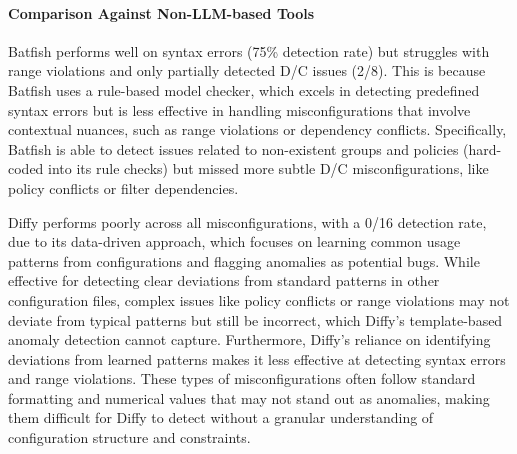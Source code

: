 


\paragraph{Comparison Against Non-LLM-based Tools}
Batfish performs well on syntax errors (75\% detection rate) but struggles
with range violations and only partially detected D/C issues (2/8).
This is because Batfish uses a rule-based model checker, which excels in detecting predefined
syntax errors but is less effective in handling misconfigurations that involve contextual nuances, such as range violations or dependency conflicts. Specifically, Batfish is able
to detect issues related to non-existent groups and policies
(hard-coded into its rule checks) but missed more subtle D/C
misconfigurations, like policy conflicts or filter dependencies.

Diffy performs poorly across all misconfigurations, with a 0/16 detection rate, due to its data-driven approach, which focuses on learning common usage patterns from configurations and flagging anomalies as potential bugs. While effective for detecting clear deviations from standard patterns in other configuration files,
complex issues like policy conflicts or range violations may not deviate from typical patterns but still be incorrect, which Diffy’s template-based anomaly detection cannot capture. Furthermore, Diffy's reliance on identifying deviations from learned patterns makes it less effective at detecting syntax errors and range violations. These types of misconfigurations often follow standard formatting and numerical values that may not stand out as anomalies, making them difficult for Diffy to detect without a granular understanding of configuration structure and constraints.


